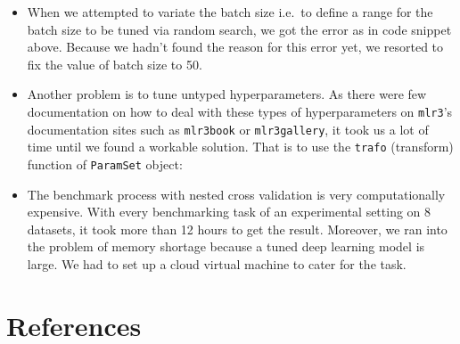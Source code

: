 \documentclass[
]{article}
\newenvironment{Shaded}{\begin{snugshade}}{\end{snugshade}}
\newcommand{\ConstantTok}[1]{\textcolor[rgb]{0.00,0.00,0.00}{#1}}
\newcommand{\ControlFlowTok}[1]{\textcolor[rgb]{0.13,0.29,0.53}{\textbf{#1}}}
\newcommand{\FunctionTok}[1]{\textcolor[rgb]{0.00,0.00,0.00}{#1}}
\newcommand{\NormalTok}[1]{#1}
\newcommand{\OtherTok}[1]{\textcolor[rgb]{0.56,0.35,0.01}{#1}}
\newcommand{\SpecialCharTok}[1]{\textcolor[rgb]{0.00,0.00,0.00}{#1}}
\providecommand{\tightlist}{%
  \setlength{\itemsep}{0pt}\setlength{\parskip}{0pt}}
\begin{document}
\begin{itemize}
\item
  When we attempted to variate the batch size i.e.~to define a range for the batch size to be tuned via random search, we got the error as in code snippet above. Because we hadn't found the reason for this error yet, we resorted to fix the value of batch size to 50.
\item
  Another problem is to tune untyped hyperparameters. As there were few documentation on how to deal with these types of hyperparameters on \texttt{mlr3}'s documentation sites such as \texttt{mlr3book} or \texttt{mlr3gallery}, it took us a lot of time until we found a workable solution. That is to use the \texttt{trafo} (transform) function of \texttt{ParamSet} object:
\end{itemize}

\begin{Shaded}
\end{Shaded}

\begin{itemize}
\tightlist
\item
  The benchmark process with nested cross validation is very computationally expensive. With every benchmarking task of an experimental setting on 8 datasets, it took more than 12 hours to get the result. Moreover, we ran into the problem of memory shortage because a tuned deep learning model is large. We had to set up a cloud virtual machine to cater for the task.
\end{itemize}

\newpage

\hypertarget{references}{%
\section{References}\label{references}}
\end{document}
